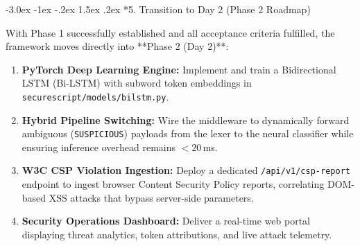 \documentclass[11pt,a4paper]{article}
\makeatletter
\renewcommand{\section}{\@startsection{section}{1}{\z@}%
  {-3.0ex \@plus -1ex \@minus -.2ex}%
  {1.5ex \@plus .2ex}%
  {\normalfont\large\bfseries\color{primaryblue}}}
\makeatother
\begin{document}
\section*{5. Transition to Day 2 (Phase 2 Roadmap)}

With Phase 1 successfully established and all acceptance criteria fulfilled, the framework moves directly into **Phase 2 (Day 2)**:
\begin{enumerate}[label=\textbf{\arabic*.}]
    \item \textbf{PyTorch Deep Learning Engine:} Implement and train a Bidirectional LSTM (Bi-LSTM) with subword token embeddings in \texttt{securescript/models/bilstm.py}.
    \item \textbf{Hybrid Pipeline Switching:} Wire the middleware to dynamically forward ambiguous (\texttt{SUSPICIOUS}) payloads from the lexer to the neural classifier while ensuring inference overhead remains $< 20$\,ms.
    \item \textbf{W3C CSP Violation Ingestion:} Deploy a dedicated \texttt{/api/v1/csp-report} endpoint to ingest browser Content Security Policy reports, correlating DOM-based XSS attacks that bypass server-side parameters.
    \item \textbf{Security Operations Dashboard:} Deliver a real-time web portal displaying threat analytics, token attributions, and live attack telemetry.
\end{enumerate}
\end{document}
